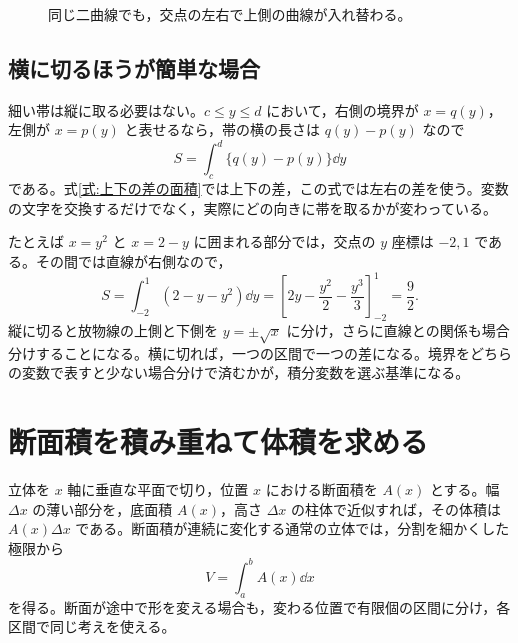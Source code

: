 \begin{figure}[htbp]
\centering
{}
\caption{同じ二曲線でも，交点の左右で上側の曲線が入れ替わる。}\label{図:面積の上下交換}
\end{figure}

\subsection{横に切るほうが簡単な場合}

細い帯は縦に取る必要はない。$c\leq y\leq d$ において，右側の境界が $x=q(y)$，左側が $x=p(y)$ と表せるなら，帯の横の長さは $q(y)-p(y)$ なので
\begin{equation}\label{式:左右の差の面積}
S=\int_c^d\{q(y)-p(y)\}\dd y
\end{equation}
である。式\eqref{式:上下の差の面積}では上下の差，この式では左右の差を使う。変数の文字を交換するだけでなく，実際にどの向きに帯を取るかが変わっている。

たとえば $x=y^2$ と $x=2-y$ に囲まれる部分では，交点の $y$ 座標は $-2,1$ である。その間では直線が右側なので，
\[
S=\int_{-2}^1(2-y-y^2)\dd y
 =\left[2y-\frac{y^2}{2}-\frac{y^3}{3}\right]_{-2}^1
 =\frac92.
\]
縦に切ると放物線の上側と下側を $y=\pm\sqrt x$ に分け，さらに直線との関係も場合分けすることになる。横に切れば，一つの区間で一つの差になる。境界をどちらの変数で表すと少ない場合分けで済むかが，積分変数を選ぶ基準になる。

\section{断面積を積み重ねて体積を求める}\label{節:断面積と体積}

立体を $x$ 軸に垂直な平面で切り，位置 $x$ における断面積を $A(x)$ とする。幅 $\Delta x$ の薄い部分を，底面積 $A(x)$，高さ $\Delta x$ の柱体で近似すれば，その体積は $A(x)\Delta x$ である。断面積が連続に変化する通常の立体では，分割を細かくした極限から
\begin{equation}\label{式:断面積の体積}
V=\int_a^b A(x)\dd x
\end{equation}
を得る。断面が途中で形を変える場合も，変わる位置で有限個の区間に分け，各区間で同じ考えを使える。

